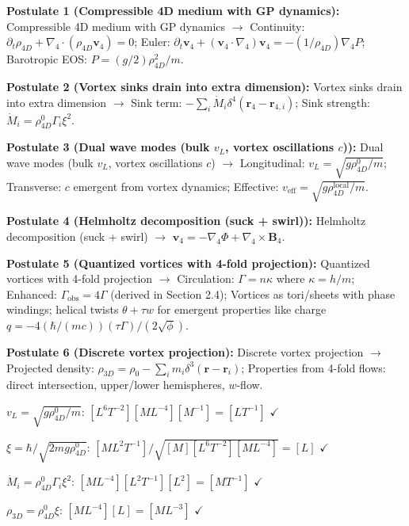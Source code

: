 \begin{tcolorbox}
\textbf{Postulate 1 (Compressible 4D medium with GP dynamics):} Compressible 4D medium with GP dynamics $\to$ Continuity: $\partial_t \rho_{4D} + \nabla_4 \cdot (\rho_{4D} \mathbf{v}_4) = 0$; Euler: $\partial_t \mathbf{v}_4 + (\mathbf{v}_4 \cdot \nabla_4) \mathbf{v}_4 = -(1/\rho_{4D}) \nabla_4 P$; Barotropic EOS: $P = (g/2) \rho_{4D}^2 / m$.

\textbf{Postulate 2 (Vortex sinks drain into extra dimension):} Vortex sinks drain into extra dimension $\to$ Sink term: $-\sum_i \dot{M}_i \delta^4(\mathbf{r}_4 - \mathbf{r}_{4,i})$; Sink strength: $\dot{M}_i = \rho_{4D}^0 \Gamma_i \xi^2$.

\textbf{Postulate 3 (Dual wave modes (bulk $v_L$, vortex oscillations $c$)):} Dual wave modes (bulk $v_L$, vortex oscillations $c$) $\to$ Longitudinal: $v_L = \sqrt{g \rho_{4D}^0 / m}$; Transverse: $c$ emergent from vortex dynamics; Effective: $v_{\text{eff}} = \sqrt{g \rho_{4D}^{\text{local}} / m}$.

\textbf{Postulate 4 (Helmholtz decomposition (suck + swirl)):} Helmholtz decomposition (suck + swirl) $\to$ $\mathbf{v}_4 = -\nabla_4 \Phi + \nabla_4 \times \mathbf{B}_4$.

\textbf{Postulate 5 (Quantized vortices with 4-fold projection):} Quantized vortices with 4-fold projection $\to$ Circulation: $\Gamma = n \kappa$ where $\kappa = h / m$; Enhanced: $\Gamma_{\text{obs}} = 4 \Gamma$ (derived in Section 2.4); Vortices as tori/sheets with phase windings; helical twists $\theta + \tau w$ for emergent properties like charge $q = -4 (\hbar / (m c)) (\tau \Gamma) / (2 \sqrt{\phi})$.

\textbf{Postulate 6 (Discrete vortex projection):} Discrete vortex projection $\to$ Projected density: $\rho_{3D} = \rho_0 - \sum_i m_i \delta^3(\mathbf{r} - \mathbf{r}_i)$; Properties from 4-fold flows: direct intersection, upper/lower hemispheres, $w$-flow.
\end{tcolorbox}

\begin{tcolorbox}[title=Dimensional Check]
$v_L = \sqrt{g \rho_{4D}^0 / m}$: $[L^6 T^{-2}] [M L^{-4}] [M^{-1}] = [L T^{-1}]$ $\checkmark$

$\xi = \hbar / \sqrt{2 m g \rho_{4D}^0}$: $[M L^2 T^{-1}] / \sqrt{[M] [L^6 T^{-2}] [M L^{-4}]} = [L]$ $\checkmark$

$\dot{M}_i = \rho_{4D}^0 \Gamma_i \xi^2$: $[M L^{-4}] [L^2 T^{-1}] [L^2] = [M T^{-1}]$ $\checkmark$

$\rho_{3D} = \rho_{4D}^0 \xi$: $[M L^{-4}] [L] = [M L^{-3}]$ $\checkmark$
\end{tcolorbox}

